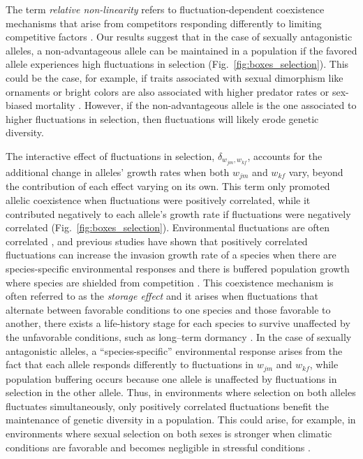 The term \textit{relative non-linearity} refers to fluctuation-dependent coexistence mechanisms that arise from competitors responding differently to limiting competitive factors \citep{chesson2000general,ellner2016quantify,zepeda2019fluctuation}. Our results suggest that in the case of sexually antagonistic alleles, a non-advantageous allele can be maintained in a population if the favored allele experiences high fluctuations in selection (Fig.~\ref{fig:boxes_selection}). This could be the case, for example, if traits associated with sexual dimorphism like ornaments or bright colors are also associated with higher predator rates \citep{bildstein1989consequences,gotmark1997natural} or sex-biased mortality \citep{promislow1992mortality}. However, if the non-advantageous allele is the one associated to higher fluctuations in selection, then fluctuations will likely erode genetic diversity.

The interactive effect of fluctuations in selection, $\delta_{w_{jm},w_{kf}}$, accounts for the additional change in alleles' growth rates when both $w_{jm}$ and $w_{kf}$ vary, beyond the contribution of each effect varying on its own.  This term only promoted allelic coexistence when fluctuations were positively correlated,  while it contributed negatively to each allele's growth rate if fluctuations were negatively correlated (Fig.~\ref{fig:boxes_selection}). Environmental fluctuations are often correlated \citep{steele1985comparison}, and previous studies have shown that positively correlated fluctuations can increase the invasion growth rate of a species when there are species-specific environmental responses and there is buffered population growth where species are shielded from competition \citep{schreiber2021positively}. This coexistence mechanism
is often referred to as the \textit{storage effect} and it arises when fluctuations that alternate between favorable conditions to one species and those favorable to another, there exists a life-history stage for each species to survive unaffected by the unfavorable conditions, such as long--term dormancy \citep{Chesson2000,ellner2016quantify,barabas_chessons_2018,schreiber2021positively}. In the case of sexually antagonistic alleles,  a ``species-specific'' environmental response arises from the fact that each allele responds differently to fluctuations in $w_{jm}$ and $w_{kf}$, while population buffering occurs because one allele is unaffected by fluctuations in selection in the other allele. Thus, in environments where selection on both alleles fluctuates simultaneously, only positively correlated fluctuations benefit the maintenance of genetic diversity in a population. This could arise, for example, in environments where sexual selection on both sexes is stronger when climatic conditions are favorable and becomes negligible in stressful conditions \citep{cockburn2008swingin}.



